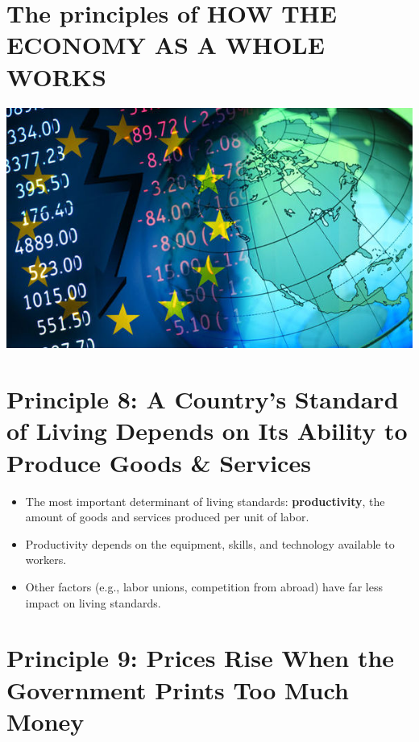 \documentclass[
]{book}
\begin{document}
\hypertarget{the-principles-of-how-the-economy-as-a-whole-works}{%
\section{The principles of HOW THE ECONOMY AS A WHOLE WORKS}\label{the-principles-of-how-the-economy-as-a-whole-works}}

\includegraphics{imgs/fig3}

\hypertarget{principle-8-a-countrys-standard-of-living-depends-on-its-ability-to-produce-goods-services}{%
\section{Principle 8: A Country's Standard of Living Depends on Its Ability to Produce Goods \& Services}\label{principle-8-a-countrys-standard-of-living-depends-on-its-ability-to-produce-goods-services}}

\begin{itemize}
\item
  The most important determinant of living standards: \textbf{productivity}, the amount of goods and services produced per unit of labor.
\item
  Productivity depends on the equipment, skills, and technology available to workers.
\item
  Other factors (e.g., labor unions, competition from abroad) have far less impact on living standards.
\end{itemize}

\hypertarget{principle-9-prices-rise-when-the-government-prints-too-much-money}{%
\section{Principle 9: Prices Rise When the Government Prints Too Much Money}\label{principle-9-prices-rise-when-the-government-prints-too-much-money}}
\end{document}
